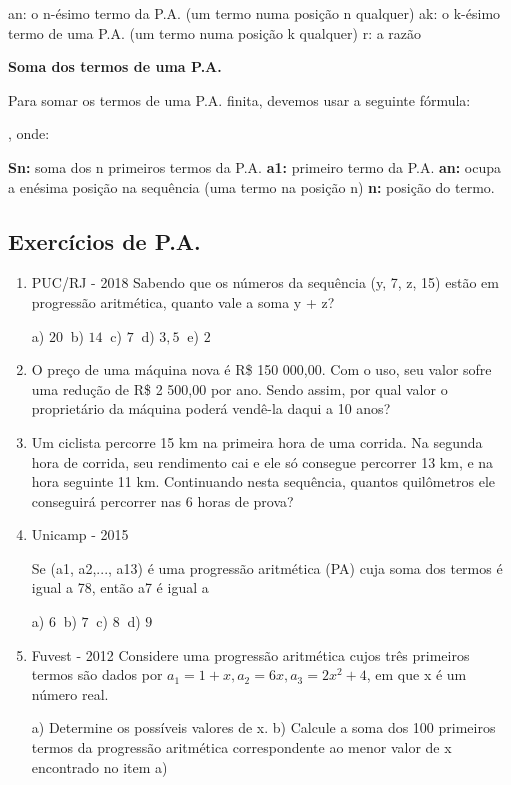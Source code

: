 \begin{multicols*}{2}
an: o n-ésimo termo da P.A. (um termo numa posição n qualquer)
ak: o k-ésimo termo de uma P.A. (um termo numa posição k qualquer)
r: a razão
	
	\textbf{Soma dos termos de uma P.A.}
	
Para somar os termos de uma P.A. finita, devemos usar a seguinte fórmula:

	, onde:

\textbf{Sn:} soma dos n primeiros termos da P.A.
\textbf{a1:} primeiro termo da P.A.
\textbf{an:} ocupa a enésima posição na sequência (uma termo na posição n)
\textbf{n:} posição do termo.

\subsection{Exercícios de P.A.}

	\begin{enumerate}

	\item PUC/RJ - 2018 Sabendo que os números da sequência (y, 7, z, 15) estão em progressão aritmética, quanto vale a soma y + z?
	
		a) $20 \ $ b) $14 \ $ c) $7 \ $ d) $3,5 \ $ e) $2 $

	\item O preço de uma máquina nova é R\$ 150 000,00. Com o uso, seu valor sofre uma redução de R\$ 2 500,00 por ano. Sendo assim, por qual valor o proprietário da máquina poderá vendê-la daqui a 10 anos?
	
	\item Um ciclista percorre 15 km na primeira hora de uma corrida. Na segunda hora de corrida, seu rendimento cai e ele só consegue percorrer 13 km, e na hora seguinte 11 km. Continuando nesta sequência, quantos quilômetros ele conseguirá percorrer nas 6 horas de prova?
	
	\item Unicamp - 2015

Se (a1, a2,..., a13) é uma progressão aritmética (PA) cuja soma dos termos é igual a 78, então a7 é igual a

		a) $6 \ $ b) $7 \ $ c) $8 \ $ d) $9 $
		
	\item Fuvest - 2012 Considere uma progressão aritmética cujos três primeiros termos são dados por $ a_1 = 1 + x, a_2 = 6x, a_3 = 2x^2 + 4$, em que x é um número real.

a) Determine os possíveis valores de x.
b) Calcule a soma dos 100 primeiros termos da progressão aritmética correspondente ao menor valor de x encontrado no item a)
	

\end{enumerate}
\end{multicols*}
